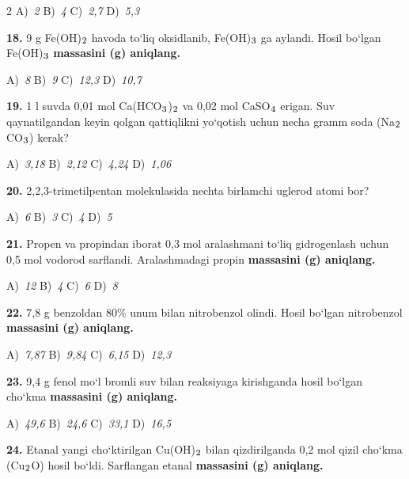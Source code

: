\documentclass[11pt,a4paper]{article}
\renewcommand{\textsubscript}[1]{\ensuremath{_{\text{\fontsize{8}{8}\selectfont #1}}}}
\begin{document}
\begin{multicols}{2}
\noindent A)~\textsl{2} \hfill B)~\textsl{4} \hfill C)~\textsl{2,7} \hfill D)~\textsl{5,3}\par
\vspace{4pt}
\noindent\textbf{18.} 9 g Fe(OH)\textsubscript{2} havoda to`liq oksidlanib, Fe(OH)\textsubscript{3} ga aylandi. Hosil bo`lgan Fe(OH)\textsubscript{3} \textbf{massasini (g) aniqlang.}

\noindent A)~\textsl{8} \hfill B)~\textsl{9} \hfill C)~\textsl{12,3} \hfill D)~\textsl{10,7}\par
\vspace{4pt}
\noindent\textbf{19.} 1 l suvda 0,01 mol Ca(HCO\textsubscript{3})\textsubscript{2} va 0,02 mol CaSO\textsubscript{4} erigan. Suv qaynatilgandan keyin qolgan qattiqlikni yo`qotish uchun necha gramm soda (Na\textsubscript{2}CO\textsubscript{3}) kerak?

\noindent A)~\textsl{3,18} \hfill B)~\textsl{2,12} \hfill C)~\textsl{4,24} \hfill D)~\textsl{1,06}\par
\vspace{4pt}
\noindent\textbf{20.} 2,2,3-trimetilpentan molekulasida nechta birlamchi uglerod atomi bor?

\noindent A)~\textsl{6} \hfill B)~\textsl{3} \hfill C)~\textsl{4} \hfill D)~\textsl{5}\par
\vspace{4pt}
\noindent\textbf{21.} Propen va propindan iborat 0,3 mol aralashmani to`liq gidrogenlash uchun 0,5 mol vodorod sarflandi. Aralashmadagi propin \textbf{massasini (g) aniqlang.}

\noindent A)~\textsl{12} \hfill B)~\textsl{4} \hfill C)~\textsl{6} \hfill D)~\textsl{8}\par
\vspace{4pt}
\noindent\textbf{22.} 7,8 g benzoldan 80\% unum bilan nitrobenzol olindi. Hosil bo`lgan nitrobenzol \textbf{massasini (g) aniqlang.}

\noindent A)~\textsl{7,87} \hfill B)~\textsl{9,84} \hfill C)~\textsl{6,15} \hfill D)~\textsl{12,3}\par
\vspace{4pt}
\noindent\textbf{23.} 9,4 g fenol mo`l bromli suv bilan reaksiyaga kirishganda hosil bo`lgan cho`kma \textbf{massasini (g) aniqlang.}

\noindent A)~\textsl{49,6} \hfill B)~\textsl{24,6} \hfill C)~\textsl{33,1} \hfill D)~\textsl{16,5}\par
\vspace{4pt}
\noindent\textbf{24.} Etanal yangi cho`ktirilgan Cu(OH)\textsubscript{2} bilan qizdirilganda 0,2 mol qizil cho`kma (Cu\textsubscript{2}O) hosil bo`ldi. Sarflangan etanal \textbf{massasini (g) aniqlang.}


\end{multicols}
\end{document}
